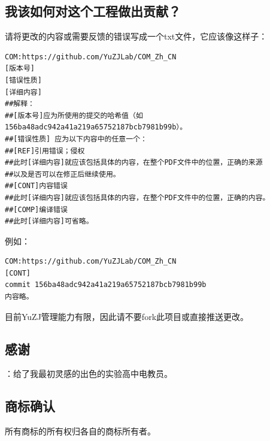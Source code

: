 \subsection{我该如何对这个工程做出贡献？}
请将更改的内容或需要反馈的错误写成一个txt文件，它应该像这样子：
\begin{verbatim}
COM:https://github.com/YuZJLab/COM_Zh_CN
[版本号]
[错误性质]
[详细内容]
##解释：
##[版本号]应为所使用的提交的哈希值（如156ba48adc942a41a219a65752187bcb7981b99b）。
##[错误性质] 应为以下内容中的任意一个：
##[REF]引用错误；侵权
##此时[详细内容]就应该包括具体的内容，在整个PDF文件中的位置，正确的来源
##以及是否可以在修正后继续使用。
##[CONT]内容错误
##此时[详细内容]就应该包括具体的内容，在整个PDF文件中的位置，正确的内容。
##[COMP]编译错误
##此时[详细内容]可省略。
\end{verbatim} \par
例如：
\begin{verbatim}
COM:https://github.com/YuZJLab/COM_Zh_CN
[CONT]
commit 156ba48adc942a41a219a65752187bcb7981b99b
内容略。
\end{verbatim} \par
目前YuZJ管理能力有限，因此请不要fork此项目或直接推送更改。
\subsection{感谢}
：给了我最初灵感的出色的实验高中电教员。
\subsection{商标确认}
所有商标的所有权归各自的商标所有者。
